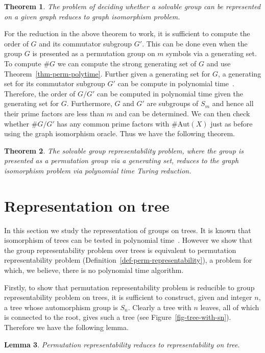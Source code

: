 \documentclass[a4paper,11pt]{article}
\newtheorem{theorem}{Theorem}[section]
\newtheorem{lemma}[theorem]{Lemma}
\newcommand{\Aut}[1]{\ensuremath{\mathrm{Aut}\left(#1\right)}}
\begin{document}
\begin{theorem}\label{thm-solvable-to-gi}
  The problem of deciding whether a solvable group can be represented
  on a given graph reduces to graph isomorphism problem.
\end{theorem}

For the reduction in the above theorem to work, it is sufficient to
compute the order of $G$ and its commutator subgroup $G'$. This can be
done even when the group $G$ is presented as a permutation group on
$m$ symbols via a generating set. To compute $\# G$ we can compute the
strong generating set of $G$ and use
Theorem~\ref{thm-perm-polytime}. Further given a generating set for
$G$, a generating set for its commutator subgroup $G'$ can be compute
in polynomial time~\cite[Theorem 4]{furst80polynomialtime}. Therefore,
the order of $G/G'$ can be computed in polynomial time given the
generating set for $G$. Furthermore, $G$ and $G'$ are subgroups of
$S_m$ and hence all their prime factors are less than $m$ and can
be determined. We can then check whether $\# G/G'$ has any common
prime factors with $\# \Aut{X}$ just as before using the graph isomorphism
oracle. Thus we have the following theorem.

\begin{theorem}
  The solvable group representability problem, where the group is
  presented as a permutation group via a generating set, reduces to
  the graph isomorphism problem via polynomial time Turing reduction.
\end{theorem}

\section{Representation on tree}\label{sect-tree-representability}

In this section we study the representation of groups on trees. It is
known that isomorphism of trees can be tested in polynomial
time~\cite{babai83canonical}. However we show that the group
representability problem over trees is equivalent to permutation
representability problem (Definition~\ref{def-perm-representability}),
a problem for which, we believe, there is no polynomial time
algorithm.

Firstly, to show that permutation representability problem is
reducible to group representability problem on trees, it is sufficient
to construct, given and integer $n$, a tree whose automorphism group
is $S_n$. Clearly a tree with $n$ leaves, all of which is connected to
the root, gives such a tree (see
Figure~\ref{fig-tree-with-sn}). Therefore we have the following lemma.
\begin{lemma}\label{lemsn2tree}
Permutation representability reduces to representability on tree.
\end{lemma}
\end{document}
